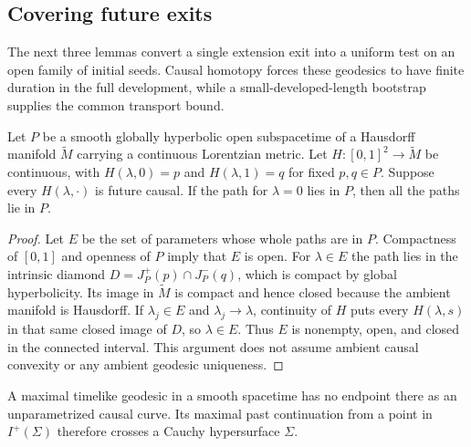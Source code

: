 \subsection{Covering future exits}

The next three lemmas convert a single extension exit into a uniform
test on an open family of initial seeds. Causal homotopy forces these
geodesics to have finite duration in the full development, while a
small-developed-length bootstrap supplies the common transport bound.

\begin{lemma}
\label{test:diamond}
Let $P$ be a smooth globally hyperbolic open subspacetime of a
Hausdorff manifold $\widetilde M$ carrying a continuous Lorentzian
metric. Let $H:[0,1]^2\to\widetilde M$ be continuous, with
$H(\lambda,0)=p$ and $H(\lambda,1)=q$ for fixed $p,q\in P$.
Suppose every $H(\lambda,\cdot)$ is future causal. If the path for
$\lambda=0$ lies in $P$, then all the paths lie in $P$.
\end{lemma}

\begin{proof}
Let $E$ be the set of parameters whose whole paths are in $P$.
Compactness of $[0,1]$ and openness of $P$ imply that $E$ is open.
For $\lambda\in E$ the path lies in the intrinsic diamond
$D=J_P^+(p)\cap J_P^-(q)$, which is compact by global
hyperbolicity. Its image in $\widetilde M$ is compact and hence
closed because the ambient manifold is Hausdorff. If
$\lambda_j\in E$ and $\lambda_j\to\lambda$, continuity of $H$
puts every $H(\lambda,s)$ in that same closed image of $D$, so
$\lambda\in E$. Thus $E$ is nonempty, open, and closed in the
connected interval. This argument does not assume ambient causal
convexity or any ambient geodesic uniqueness.
\end{proof}

\begin{lemma}
\label{test:interior-endpoint}
A maximal timelike geodesic in a smooth spacetime has no endpoint
there as an unparametrized causal curve. Its maximal past continuation
from a point in $I^+(\Sigma)$ therefore crosses a Cauchy
hypersurface $\Sigma$.
\end{lemma}


